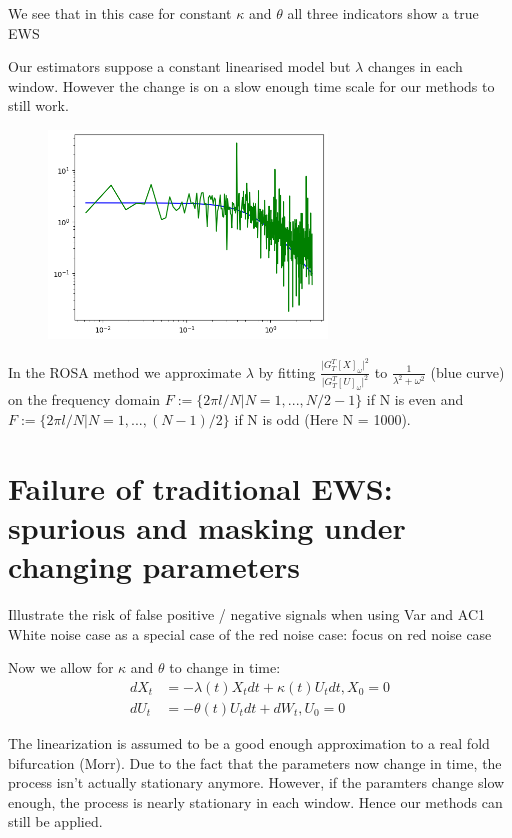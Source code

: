 \documentclass[%
thesis=student,%
coverpage=false,%
titlepage=false,%
headmarks=true, %
german,%
font=libertine, %
math=newpxtx, %
BCOR=5mm,%
coverBCOR=11mm%
]{tumbook}
\begin{document}
We see that in this case for constant $\kappa$ and $\theta$ all three indicators show a true EWS


Our estimators suppose a constant linearised model but $\lambda$ changes in each window. However the change is on a slow enough time scale for our methods to still work.

\begin{figure}
    \centering
    \includegraphics[width=0.66\textwidth]{figures/observed_psd_vs_contin_ratio.png}
\end{figure}
In the ROSA method 
we approximate $\lambda$ by fitting $\frac{\lvert G_{T}^{T}[X]_{\omega} \rvert ^2}{\lvert G_{T}^{T}[U]_{\omega} \rvert ^2}$ to $\frac{1}{\lambda ^2 + \omega ^2}$ (blue curve) on the frequency domain $F:=\{2\pi l/N | N = 1,...,N/2 - 1\}$ if N is even and $F := \{2\pi l/N | N = 1,...,(N-1)/2 \}$ if N is odd (Here N = 1000). 


\chapter{Failure of traditional EWS: spurious and masking under changing parameters}

Illustrate the risk of false positive / negative signals when using Var and AC1
White noise case as a special case of the red noise case: focus on red noise case

Now we allow for $\kappa$ and $\theta$ to change in time:
    \begin{subequations}
    \begin{align*}
        dX_{t} &= -\lambda(t) X_{t}dt + \kappa(t) U_{t}dt, X_{0} = 0 \\
        dU_{t} &= -\theta(t) U_{t}dt + dW_{t}, U_{0} = 0
    \end{align*}
    \end{subequations}

The linearization is assumed to be a good enough approximation to a real fold bifurcation (Morr). Due to the fact that the parameters now change in time, the process isn't actually stationary anymore. However, if the paramters change slow enough, the process is nearly stationary in each window. Hence our methods can still be applied.
\end{document}
